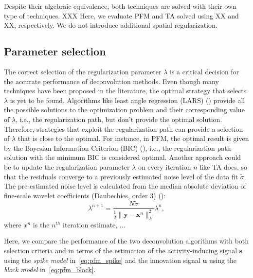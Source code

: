 Despite their algebraic equivalence, both techniques are solved with their own type of techniques. XXX
Here, we evaluate PFM and TA solved using XX and XX, respectively. We do not introduce additional spatial regularization. 



\subsection{Parameter selection}
\label{sec:regparam}

The correct selection of the regularization parameter \(\lambda\) is a critical decision for the accurate performance of deconvolution methods. Even though many techniques have been proposed in the literature, the optimal strategy that selects \(\lambda\) is yet to be found. Algorithms like least angle regression (LARS) (\citealt{efron2004LeastAngleRegression}) provide all the possible solutions to the optimization problem and their corresponding value of \(\lambda\), i.e., the regularization path, but don't provide the optimal solution. Therefore, strategies that exploit the regularization path can provide a selection of \(\lambda\) that is close to the optimal. For instance, in PFM, the optimal result is given by the Bayesian Information Criterion (BIC) (\citealt{schwarz1978EstimatingDimensionModel}), i.e., the regularization path solution with the minimum BIC is considered optimal. Another approach could be to update the regularization parameter \(\lambda\) on every iteration \(n\) like TA does, so that the residuals converge to a previously estimated noise level of the data fit \(\tilde{\sigma}\). The pre-estimated noise level is calculated from the median absolute deviation of fine-scale wavelet coefficients (Daubechies, order 3) (\citealt{karahanoglu2013TotalActivationFMRI}):
\begin{equation}
    \lambda^{n+1} = \frac{N \tilde{\sigma}}{\frac{1}{2} \| \mathbf{y} - \mathbf{x}^n \|_F^2} \lambda^n,
\label{eq:std}
\end{equation}
where $x^n$ is the $n^{th}$ iteration estimate, ...

Here, we compare the performance of the two deconvolution algorithms with both selection criteria and in terms of the estimation of the activity-inducing signal \(\mathbf{s}\) using the \textit{spike model} in~\eqref{eq:pfm_spike} and the innovation signal \(\mathbf{u}\) using the \textit{block model} in~\eqref{eq:pfm_block}.